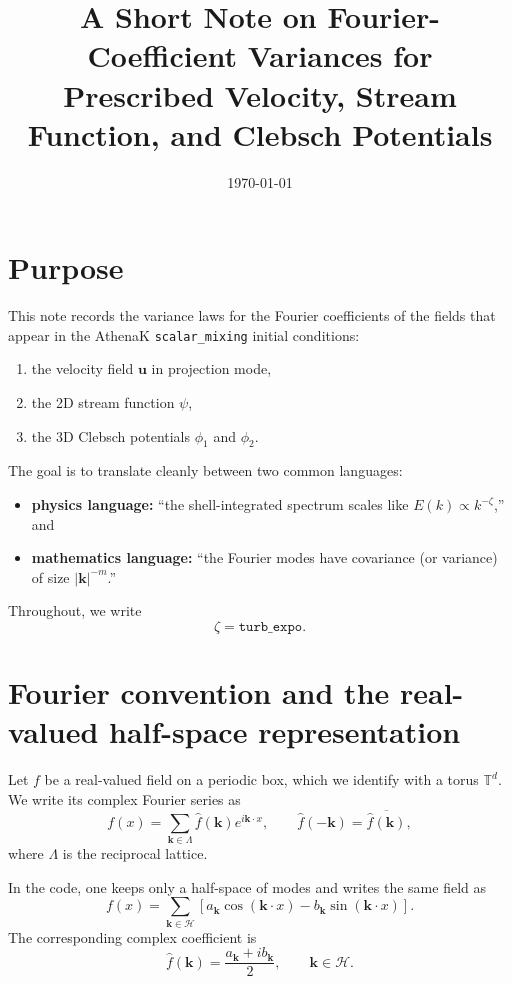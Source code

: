 \documentclass[11pt]{article}
\title{A Short Note on Fourier-Coefficient Variances for\\
Prescribed Velocity, Stream Function, and Clebsch Potentials}
\author{}
\date{\today}
\newcommand{\kk}{\mathbf{k}}
\newcommand{\uu}{\mathbf{u}}
\newcommand{\T}{\mathbb{T}}
\begin{document}
\maketitle

\section{Purpose}
This note records the variance laws for the Fourier coefficients of the fields that appear in the AthenaK \texttt{scalar\_mixing} initial conditions:
\begin{enumerate}
\item the velocity field $\uu$ in projection mode,
\item the 2D stream function $\psi$,
\item the 3D Clebsch potentials $\phi_1$ and $\phi_2$.
\end{enumerate}

The goal is to translate cleanly between two common languages:
\begin{itemize}
\item \textbf{physics language:} ``the shell-integrated spectrum scales like $E(k)\propto k^{-\zeta}$,'' and
\item \textbf{mathematics language:} ``the Fourier modes have covariance (or variance) of size $|\kk|^{-m}$.''
\end{itemize}

Throughout, we write
\begin{equation}
\zeta = \texttt{turb\_expo}.
\end{equation}

\section{Fourier convention and the real-valued half-space representation}
Let $f$ be a real-valued field on a periodic box, which we identify with a torus $\T^d$. We write its complex Fourier series as
\begin{equation}
f(x) = \sum_{\kk \in \Lambda} \hat{f}(\kk)e^{i\kk\cdot x},
\qquad
\hat{f}(-\kk)=\overline{\hat{f}(\kk)},
\end{equation}
where $\Lambda$ is the reciprocal lattice.

In the code, one keeps only a half-space of modes and writes the same field as
\begin{equation}
f(x)=\sum_{\kk\in\mathcal{H}}
\left[a_{\kk}\cos(\kk\cdot x)-b_{\kk}\sin(\kk\cdot x)\right].
\label{eq:real-half-space}
\end{equation}
The corresponding complex coefficient is
\begin{equation}
\hat{f}(\kk)=\frac{a_{\kk}+ib_{\kk}}{2},
\qquad \kk\in\mathcal{H}.
\label{eq:complex-vs-real}
\end{equation}
\end{document}
